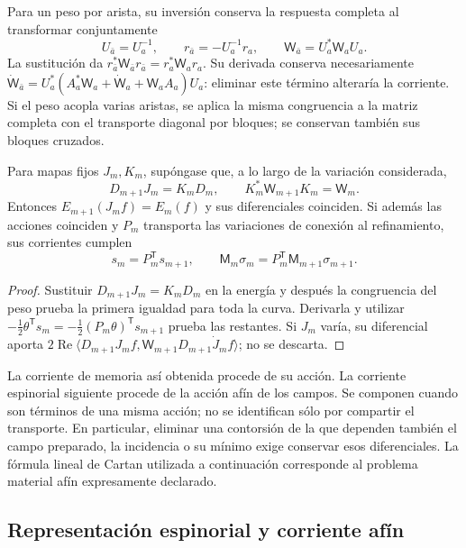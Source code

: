 Para un peso por arista, su inversión conserva la respuesta completa
al transformar conjuntamente
\[
 U_{\bar a}=U_a^{-1},\qquad
 r_{\bar a}=-U_a^{-1}r_a,\qquad
 \mathsf W_{\bar a}=U_a^*\mathsf W_aU_a .
\]
La sustitución da
\(r_{\bar a}^*\mathsf W_{\bar a}r_{\bar a}=r_a^*\mathsf W_ar_a\).
Su derivada conserva necesariamente
\(\dot{\mathsf W}_{\bar a}
=U_a^*(A_a^*\mathsf W_a+\dot{\mathsf W}_a+\mathsf W_aA_a)U_a\):
eliminar este término alteraría la corriente. Si el peso acopla varias
aristas, se aplica la misma congruencia a la matriz completa con el
transporte diagonal por bloques; se conservan también sus bloques
cruzados.

\begin{proposition}
\label{hmtcuatro:ant:refinamiento-corriente}
Para mapas fijos \(J_m,K_m\), supóngase que, a lo largo de la
variación considerada,
\[
 D_{m+1}J_m=K_mD_m,\qquad
 K_m^*\mathsf W_{m+1}K_m=\mathsf W_m .
\]
Entonces \(E_{m+1}(J_mf)=E_m(f)\) y sus diferenciales coinciden.
Si además las acciones coinciden y \(P_m\) transporta las
variaciones de conexión al refinamiento, sus corrientes cumplen
\[
 s_m=P_m^{\mathsf T}s_{m+1},\qquad
 \mathsf M_m\sigma_m=P_m^{\mathsf T}\mathsf M_{m+1}\sigma_{m+1}.
\]
\end{proposition}
\begin{proof}
Sustituir \(D_{m+1}J_m=K_mD_m\) en la energía y después la
congruencia del peso prueba la primera igualdad para toda la
curva. Derivarla y utilizar
\(-\frac12\theta^{\mathsf T}s_m
=-\frac12(P_m\theta)^{\mathsf T}s_{m+1}\)
prueba las restantes. Si \(J_m\) varía, su diferencial aporta
\(2\operatorname{Re}\langle D_{m+1}J_mf,
\mathsf W_{m+1}D_{m+1}\dot J_m f\rangle\); no se descarta.
\end{proof}

La corriente de memoria así obtenida procede de su acción.
La corriente espinorial siguiente procede de la acción afín de
los campos. Se componen cuando son términos de una misma acción;
no se identifican sólo por compartir el transporte. En particular,
eliminar una contorsión de la que dependen también el campo
preparado, la incidencia o su mínimo exige conservar esos
diferenciales. La fórmula lineal de Cartan utilizada a continuación
corresponde al problema material afín expresamente declarado.

\subsection{Representación espinorial y corriente afín}
\label{hmtcuatro:ant:espinores}


